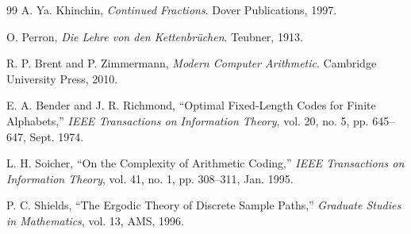 \documentclass[10pt, conference]{IEEEtran}
\begin{document}
\begin{thebibliography}{99}
A. Ya. Khinchin, \textit{Continued Fractions}. Dover Publications, 1997.

O. Perron, \textit{Die Lehre von den Kettenbr\"uchen}. Teubner, 1913.

R. P. Brent and P. Zimmermann, \textit{Modern Computer Arithmetic}. Cambridge University Press, 2010.

E. A. Bender and J. R. Richmond, ``Optimal Fixed-Length Codes for Finite Alphabets,'' \textit{IEEE Transactions on Information Theory}, vol. 20, no. 5, pp. 645--647, Sept. 1974.

L. H. Soicher, ``On the Complexity of Arithmetic Coding,'' \textit{IEEE Transactions on Information Theory}, vol. 41, no. 1, pp. 308--311, Jan. 1995.

P. C. Shields, ``The Ergodic Theory of Discrete Sample Paths,'' \textit{Graduate Studies in Mathematics}, vol. 13, AMS, 1996.

\end{thebibliography}
\end{document}
